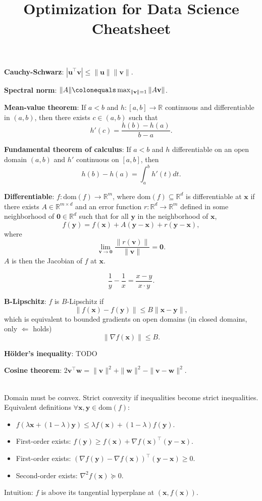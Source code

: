 \documentclass{article}
\title{Optimization for Data Science Cheatsheet}
\newcommand{\R}{\mathbb{R}}
\renewcommand{\vec}[1]{\mathbf{#1}}
\newcommand{\mat}[1]{#1}
\newcommand{\transpose}[1]{#1^\top}
\newcommand{\dom}[1]{\mathrm{dom}(#1)}
\newenvironment{topic}[1]
{\textbf{\sffamily \colorbox{black}{\rlap{\textbf{\textcolor{white}{#1}}}\hspace{\linewidth}\hspace{-2\fboxsep}}} \\ \vspace{0.2cm}}
{}
\begin{document}
\setlength{\columnsep}{0.2cm}

\begin{multicols*}{2}
    \textbf{Cauchy-Schwarz}: $|\transpose{\vec{u}} \vec{v}| \leq \| \vec{u} \| \| \vec{v} \|$.

    \textbf{Spectral norm}: $\| \mat{A} \| \colonequals \max_{\| \vec{v} \| = 1} \| \mat{A} \vec{v} \|$.

    \textbf{Mean-value theorem}: If $a < b$ and $h: [a,b] \to \R$ continuous and differentiable in $(a,b)$, then
    there exists $c \in (a,b)$ such that \[
        h'(c) = \frac{h(b) - h(a)}{b-a}.
    \]

    \textbf{Fundamental theorem of calculus}: If $a < b$ and $h$ differentiable on an open domain $(a,b)$ and
    $h'$ continuous on $[a,b]$, then \[
        h(b) - h(a) = \int_a^b h'(t)dt.
    \]

    \textbf{Differentiable}: $f: \dom{f} \to \R^m$, where $\dom{f} \subseteq \R^d$ is differentiable at
    $\vec{x}$ if there exists $\mat{A} \in \R^{m \times d}$ and an error function $r: \R^d \to \R^m$
    defined in some neighborhood of $\vec{0} \in \R^d$ such that for all $\vec{y}$ in the neighborhood
    of $\vec{x}$, \[
        f(\vec{y}) = f(\vec{x}) + \mat{A} (\vec{y} - \vec{x}) + r(\vec{y} - \vec{x}),
    \]
    where \[
        \lim_{\vec{v} \to \vec{0}} \frac{\| r(\vec{v}) \|}{\| \vec{v} \|} = \vec{0}.
    \]
    $\mat{A}$ is then the Jacobian of $f$ at $\vec{x}$.

    \[
        \frac{1}{y} - \frac{1}{x} = \frac{x-y}{x\cdot y}.
    \]

    \textbf{B-Lipschitz}: $f$ is $B$-Lipschitz if \[
        \| f(\vec{x}) - f(\vec{y}) \| \leq B \| \vec{x} - \vec{y} \|,
    \]
    which is equivalent to bounded gradients on open domains (in closed domains, only $\Leftarrow$
    holds) \[
        \| \nabla f(\vec{x}) \| \leq B.
    \]

    \textbf{H\"older's inequality}: TODO

    \textbf{Cosine theorem}: $2 \transpose{\vec{v}}\vec{w} = \| \vec{v} \|^2 + \| \vec{w} \|^2 - \| \vec{v} - \vec{w} \|^2$.

    \begin{topic}{2 Convexity}
        Domain must be convex. Strict convexity if inequalities become strict inequalities.
        Equivalent definitions $\forall \vec{x},\vec{y} \in \dom{f}$:
        \begin{itemize}
            \item $f(\lambda \vec{x} + (1-\lambda)\vec{y}) \leq \lambda f(\vec{x}) + (1-\lambda) f(\vec{y})$.
            \item First-order exists: $f(\vec{y}) \geq f(\vec{x}) + \transpose{\nabla f(\vec{x})} (\vec{y} -
                      \vec{x})$.
            \item First-order exists: $\transpose{(\nabla f(\vec{y}) - \nabla f(\vec{x}))} (\vec{y} - \vec{x}) \geq
                      0$.
            \item Second-order exists: $\nabla^2 f(\vec{x}) \succeq \mat{0}$.
        \end{itemize}
        Intuition: $f$ is above its tangential hyperplane at $(\vec{x}, f(\vec{x}))$.


\end{topic}
\end{multicols*}
\end{document}
